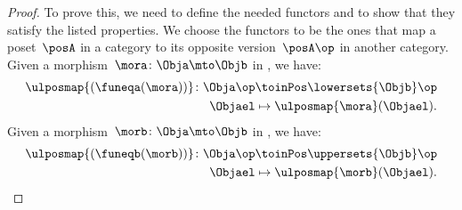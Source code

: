 \begin{proof}
To prove this, we need to define the needed functors and to show that they satisfy the listed properties.
We choose the functors to be the ones that map a poset~$\posA$ in a category to its opposite version~$\posA\op$ in another category.
Given a morphism~$\mora\colon \Obja \mto \Objb$ in \UPos, we have:
\begin{equation*}
    \begin{aligned}
        \ulposmap{(\funeqa(\mora))}\colon \Obja\op &\toinPos \lowersets{\Objb}\op\\
    \Objael&\mapsto \ulposmap{\mora}(\Objael).
    \end{aligned}
\end{equation*}
Given a morphism~$\morb\colon \Obja \mto \Objb$ in \LPos, we have:
\begin{equation*}
    \begin{aligned}
    \ulposmap{(\funeqb(\morb))}\colon \Obja\op &\toinPos \uppersets{\Objb}\op\\
    \Objael&\mapsto \ulposmap{\morb}(\Objael).
    \end{aligned}
\end{equation*}

\end{proof}
